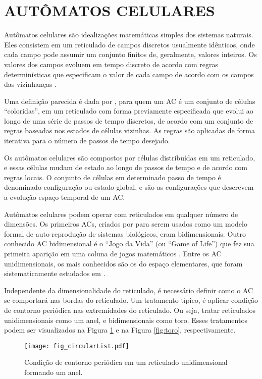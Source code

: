 \section{AUTÔMATOS CELULARES}\label{sec:acs}
Autômatos celulares são idealizações matemáticas simples dos sistemas naturais. Eles consistem em um reticulado de campos discretos usualmente idênticos, onde cada campo pode assumir um conjunto finitos de, geralmente, valores inteiros. Os valores dos campos evoluem em tempo discreto de acordo com regras determinísticas que especificam o valor de cada campo de acordo com os campos das vizinhanças \cite{wolfram1994cellular}.

Uma definição parecida é dada por , para quem um AC é um conjunto de células ``coloridas'', em um reticulado com forma previamente especificada que evolui ao longo de uma série de passos de tempo discretos, de acordo com um conjunto de regras baseadas nos estados de células vizinhas. As regras são aplicadas de forma iterativa para o número de passos de tempo desejado.

Os autômatos celulares são compostos por células distribuídas em um reticulado, e essas células mudam de estado ao longo de passos de tempo e de acordo com regras locais. O conjunto de células em determinado passo de tempo é denominado configuração ou estado global, e são as configurações que descrevem a evolução espaço temporal de um AC. 

Autômatos celulares podem operar com reticulados em qualquer número de dimensões. Os primeiros ACs, criados por  para serem usados como um modelo formal de auto-reprodução de sistemas biológicos, eram bidimensionais. Outro conhecido AC bidimensional é o ``Jogo da Vida'' (ou ``Game of Life'') que fez sua primeira aparição em uma coluna de jogos matemáticos \cite{GardnerM1970}. Entre os AC unidimensionais, os mais conhecidos são os do espaço elementares, que foram sistematicamente estudados em .

Independente da dimensionalidade do reticulado, é necessário definir como o AC se comportará nas bordas do reticulado. Um tratamento típico, é aplicar condição de contorno periódica nas extremidades do reticulado. Ou seja, tratar reticulados unidimensionais como um anel, e bidimensionais como toro. Esses tratamentos podem ser visualizados na Figura \ref{fig:anel} e na Figura \ref{fig:toro}, respectivamente.  
	\begin{figure}[h!]
	  \centering
	  \texttt{[image: fig\_circularList.pdf]}
	  \caption{Condição de contorno periódica em um reticulado unidimensional formando um anel.}
	  \label{fig:anel}
	\end{figure}

